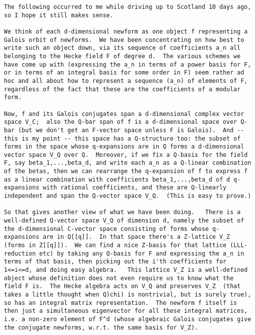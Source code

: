 \documentclass[11pt]{amsart}
\numberwithin{equation}{subsection}
\theoremstyle{definition}
\begin{document}
\begin{verbatim}
The following occurred to me while driving up to Scotland 10 days ago, so I hope it still makes sense.

We think of each d-dimensional newform as one object f representing a Galois orbit of newforms.  We have been concentrating on how best to write such an object down, via its sequence of coefficients a_n all belonging to the Hecke field F of degree d.  The various schemes we have come up with (expressing the a_n in terms of a power basis for F, or in terms of an integral basis for some order in F) seem rather ad hoc and all about how to represent a sequence (a_n) of elements of F, regardless of the fact that these are the coefficients of a modular form.

Now, f and its Galois conjugates span a d-dimensional complex vector space V_C;  also the Q-bar span of f is a d-dimensional space over Q-bar (but we don't get an F-vector space unless F is Galois).  And -- this is my point -- this space has a Q-structure too: the subset of forms in the space whose q-expansions are in Q forms a d-dimensional vector space V_Q over Q.  Moreover, if we fix a Q-basis for the field F, say beta_1,...,beta_d, and write each a_n as a Q-linear combination of the betas, then we can rearrange the q-expansion of f to express f as a linear combination with coefficients beta_1,...,beta_d of d q-expansions with rational coefficients, and these are Q-linearly independent and span the Q-vector space V_Q.  (This is easy to prove.)

So that gives another view of what we have been doing.   There is a well-defined Q-vector space V_Q of dimension d, namely the subset of the d-dimensional C-vector space consisting of forms whose q-expansions are in Q[[q]].  In that space there's a Z-lattice V_Z (forms in Z[[q]]).  We can find a nice Z-basis for that lattice (LLL-reduction etc) by taking any Q-basis for F and expressing the a_n in terms of that basis, then picking out the i'th coefficients for 1<=i<=d, and doing easy algebra.   This lattice V_Z is a well-defined object whose definition does not even require us to know what the field F is.  The Hecke algebra acts on V_Q and preserves V_Z  (that takes a little thought when Q)chi) is nontrivial, but is surely true), so has an integral matrix representation.  The newform f itself is then just a simultaneous eigenvector for all these integral matrices, i.e. a non-zero element of F^d (whose algebraic Galois conjugates give the conjugate newforms, w.r.t. the same basis for V_Z).


\end{verbatim}
\end{document}
